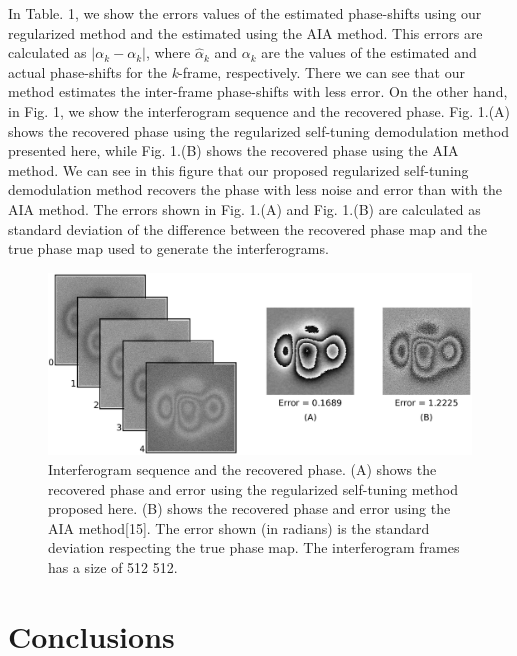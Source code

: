 In Table. 1, we show the errors values of the estimated phase-shifts using our
regularized method and the estimated using the AIA method. This errors
are calculated as $|\alpha_{k} - \alpha_{k}|$,
where $\hat{\alpha}_{k}$ and $\alpha_{k}$ are the values of the
estimated and actual phase-shifts for the \emph{k}-frame, respectively.
There we can see that our method estimates the inter-frame phase-shifts
with less error. On the other hand, in Fig. 1, we show the interferogram 
sequence and the recovered phase. Fig.
1.(A) shows the recovered phase using the regularized self-tuning
demodulation method presented here, while Fig. 1.(B) shows the recovered
phase using the AIA method. We can see in this figure that our proposed
regularized self-tuning demodulation method recovers the phase with
less noise and error than with the AIA method. The errors shown in
Fig. 1.(A) and Fig. 1.(B) are calculated as standard deviation of
the difference between the recovered phase map and the true phase
map used to generate the interferograms.

\begin{figure}
\begin{centering}
\includegraphics[scale=0.2]{Chpt2_figures/Steps.eps}
\par\end{centering}

\caption{Interferogram sequence and the recovered phase. (A) shows the recovered
phase and error using the regularized self-tuning method proposed
here. (B) shows the recovered phase and error using the AIA method{[}15{]}.
The error shown (in radians) is the standard deviation respecting
the true phase map. The interferogram frames has a size of 512 \texttimes{}
512.}
\end{figure}

\section{Conclusions}


